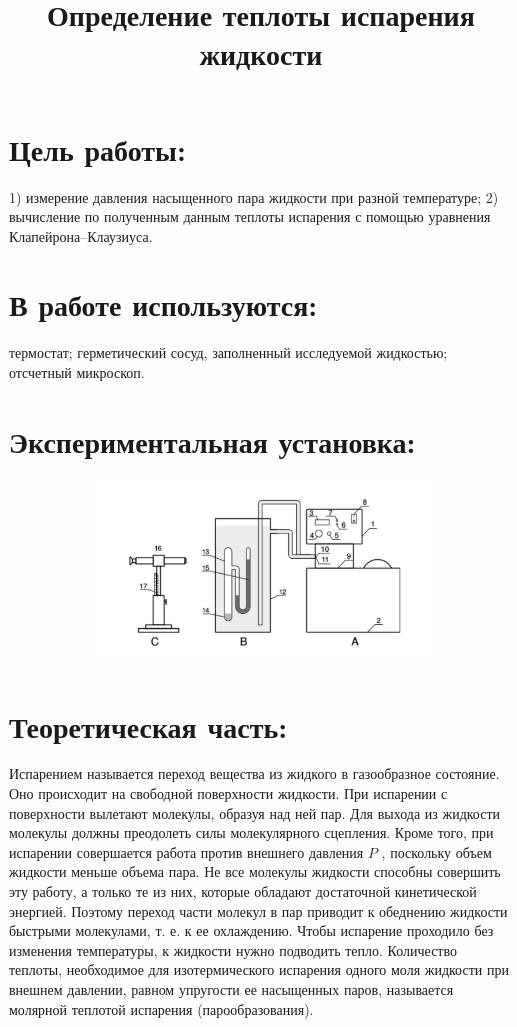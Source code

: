 \documentclass[a4paper, 12pt]{article}
\author{}
\title{Определение теплоты испарения жидкости}
\date{}
\begin{document}
\maketitle
\section{Цель работы:}
1) измерение давления насыщенного пара жидкости при разной температуре;
2) вычисление по полученным данным теплоты испарения с помощью уравнения Клапейрона–Клаузиуса.
\section{В работе используются:}
термостат; герметический сосуд, заполненный исследуемой жидкостью; отсчетный микроскоп.
\section{Экспериментальная установка:}
\begin{figure}[H]\begin{figure}[H]
\center
\includegraphics[scale=0.5]{Screenshot from 2023-02-19 23-54-35.png}
\end{figure}
\end{figure}
\section{Теоретическая часть:}
Испарением называется переход вещества из жидкого в газообразное состояние. 
Оно происходит на свободной поверхности жидкости. При испарении с поверхности 
вылетают молекулы, образуя над ней пар. Для выхода из жидкости молекулы должны 
преодолеть силы молекулярного сцепления. Кроме того, при испарении совершается 
работа против внешнего давления $P$ , поскольку объем жидкости меньше объема 
пара. Не все молекулы жидкости способны совершить эту работу, а только те из 
них, которые обладают достаточной кинетической энергией. Поэтому переход части 
молекул в пар приводит к обеднению жидкости быстрыми молекулами, т. е. к ее 
охлаждению. Чтобы испарение проходило без изменения температуры, к жидкости
нужно подводить тепло. Количество теплоты, необходимое для изотермического 
испарения одного моля жидкости при внешнем давлении, равном упругости ее 
насыщенных паров, называется молярной теплотой испарения (парообразования).
\end{document}
